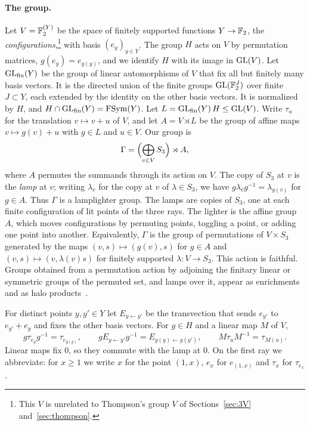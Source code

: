 \paragraph{The group.} Let $V=\mathbb F_2^{(Y)}$ be the space of finitely supported functions $Y\to\mathbb F_2$, the \emph{configurations},\footnote{This $V$ is
unrelated to Thompson's group $V$ of Sections~\ref{sec:3V} and~\ref{sec:thompson}.} with basis $(e_y)_{y\in Y}$. The group $H$ acts on $V$ by permutation matrices, $g(e_y)=e_{g(y)}$, and we identify $H$ with its image in $\operatorname{GL}(V)$. Let
$\operatorname{GL}_{\rm fin}(Y)$ be the group of linear automorphisms of $V$ that fix all but finitely many basis vectors. It is the directed union of the finite
groups $\operatorname{GL}(\mathbb F_2^J)$ over finite $J\subset Y$, each extended by the identity on the other basis vectors. It is normalized by $H$, and
$H\cap\operatorname{GL}_{\rm fin}(Y)=\operatorname{FSym}(Y)$. Let $L=\operatorname{GL}_{\rm fin}(Y)\,H\le\operatorname{GL}(V)$. Write $\tau_u$ for the translation $v\mapsto v+u$ of $V$, and let
$A=V\rtimes L$ be the group of affine maps $v\mapsto g(v)+u$ with $g\in L$ and $u\in V$. Our group is
\[
\Gamma=\Bigl(\bigoplus_{v\in V}S_3\Bigr)\rtimes A,
\]
where $A$ permutes the summands through its action on $V$. The copy of $S_3$ at $v$ is the \emph{lamp} at $v$; writing $\lambda_v$ for the copy
at $v$ of $\lambda\in S_3$, we have $g\lambda_vg^{-1}=\lambda_{g(v)}$ for $g\in A$. Thus $\Gamma$ is a lamplighter group. The lamps are copies of
$S_3$, one at each finite configuration of lit points of the three rays. The lighter is the affine group $A$, which moves configurations by
permuting points, toggling a point, or adding one point into another. Equivalently, $\Gamma$ is the group of permutations of $V\times S_3$
generated by the maps $(v,s)\mapsto(g(v),s)$ for $g\in A$ and $(v,s)\mapsto(v,\lambda(v)s)$ for finitely supported $\lambda:V\to S_3$. This
action is faithful. Groups obtained from a permutation action by adjoining the finitary linear or symmetric groups of the permuted set, and lamps
over it, appear as enrichments~\cite{Bradford2022,AlekseevBradford2026} and as halo products~\cite{GenevoisTessera2024}.

For distinct points $y,y'\in Y$ let $E_{y\leftarrow y'}$ be the transvection that sends $e_{y'}$ to $e_{y'}+e_y$ and fixes the other basis vectors.
For $g\in H$ and a linear map $M$ of $V$,
\begin{equation}\label{eq:affine-identities}
g\tau_{e_y}g^{-1}=\tau_{e_{g(y)}},\qquad gE_{y\leftarrow y'}g^{-1}=E_{g(y)\leftarrow g(y')},\qquad M\tau_uM^{-1}=\tau_{M(u)} .
\end{equation}
Linear maps fix $0$, so they commute with the lamp at $0$. On the first ray we abbreviate: for $x\ge1$ we write $x$ for the point $(1,x)$,
$e_x$ for $e_{(1,x)}$ and $\tau_x$ for $\tau_{e_x}$.

